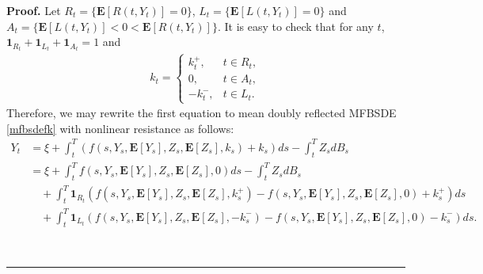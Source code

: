 \documentclass[10pt]{article}%
\numberwithin{equation}{section}
\newenvironment{proof}[1][Proof]{\noindent \textbf{#1.} }{\  \rule{0.5em}{0.5em}}
\def \E{\mathbf{E}}
\begin{document}
\begin{proof}
Let $R_t=\{\E[R(t,Y_t)]=0\}$, $L_t=\{\E[L(t,Y_t)]=0\}$ and $A_t=\{\E[L(t,Y_t)]<0<\E[R(t,Y_t)]\}$. It is easy to check that for any $t$, $\mathbf{1}_{R_t}+\mathbf{1}_{L_t}+\mathbf{1}_{A_t}=1$ and 
\begin{align*}
    k_t=\begin{cases}
        k^+_t, & t\in R_t,\\
        0, &t\in A_t,\\
        -k^-_t, &t\in L_t.
    \end{cases}
\end{align*}
Therefore, we may rewrite the first equation to mean doubly reflected MFBSDE \eqref{mfbsdefk} with nonlinear resistance as follows:
    \begin{equation}
        \begin{split}
            Y_t&=\xi+\int_{t}^{T}\left(f(s,Y_s,\mathbf{E}[Y_s],Z_s,\mathbf{E}[Z_s],k_s)+k_s\right) ds-\int_{t}^{T}Z_sdB_s\\
           &=\xi+\int_{t}^{T}f(s,Y_s,\mathbf{E}[Y_s],Z_s,\mathbf{E}[Z_s],0) ds-\int_{t}^{T}Z_sdB_s\\
           &\quad +\int_{t}^{T}\mathbf{1}_{R_t}\left(f(s,Y_s,\mathbf{E}[Y_s],Z_s,\mathbf{E}[Z_s],k^+_s)-f(s,Y_s,\mathbf{E}[Y_s],Z_s,\mathbf{E}[Z_s],0)+k_s^+\right)ds\\
            &\quad +\int_{t}^{T}\mathbf{1}_{L_t}\left(f(s,Y_s,\mathbf{E}[Y_s],Z_s,\mathbf{E}[Z_s],{-k^-_s})-f(s,Y_s,\mathbf{E}[Y_s],Z_s,\mathbf{E}[Z_s],0)-k_s^-\right)ds.
        \end{split}
    \end{equation} 

\end{proof}
\end{document}
